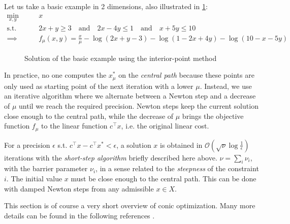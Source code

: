 \documentclass[11 pt]{report}
\begin{document}
Let us take a basic example in 2 dimensions, also illustrated in \cref{fig:interior_pt}:
\begin{equation*}
\begin{aligned}
    \min_{x,y} \qquad &x\\
    \text{s.t.} \qquad & 2x + y \geq 3 \quad\text{and}\quad 2x - 4y \leq 1 \quad\text{and}\quad x + 5y \leq 10\\
    \implies \qquad & f_{\mu}(x,y) = \frac{x}{\mu} - \log(2x+y-3) - \log(1-2x+4y) - \log(10 - x - 5y)
\end{aligned}
\end{equation*}

\begin{figure}[ht]
    \centering
    
    \caption{Solution of the basic example using the interior-point method}
    \label{fig:interior_pt}
\end{figure}

In practice, no one computes the $x^*_{\mu}$ on the \textit{central path} because these points are only used as starting point of the next iteration with a lower $\mu$. Instead, we use an iterative algorithm where we alternate between a Newton step and a decrease of $\mu$ until we reach the required precision. Newton steps keep the current solution close enough to the central path, while the decrease of $\mu$ brings the objective function $f_{\mu}$ to the linear function $c^\top x$, i.e. the original linear cost.

For a precision $\epsilon$ s.t. $c^\top x - c^\top x^* < \epsilon$, a solution $x$ is obtained in $\mathcal{O}(\sqrt{\nu} \log \frac{1}{\epsilon})$ iterations with the \textit{short-step algorithm} briefly described here above. $\nu = \sum_{i} \nu_i$, with the barrier parameter $\nu_i$, in a sense related to the \textit{steepness} of the constraint $i$. The initial value $x$ must be close enough to the central path. This can be done with damped Newton steps from any admissible $x \in X$.
\pagebreak

This section is of course a very short overview of conic optimization. Many more details can be found in the following references \cite{ben2001lectures,nesterov2003introductory,nesterov2018lectures}.
\end{document}
